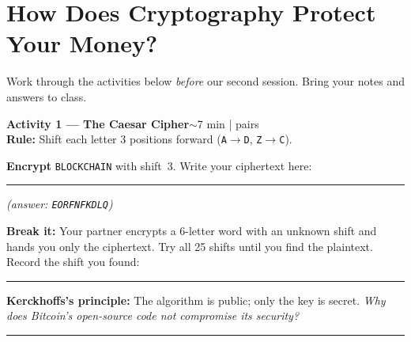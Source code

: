 \documentclass[11pt,a4paper]{article}
\newcommand{\activitybox}[3]{%
  \noindent\colorbox{mllavender4}{\parbox{\dimexpr\linewidth-2\fboxsep}{%
    \textbf{\color{mlpurple}#1}\hfill\textcolor{mlgray}{\small #2}\\[2pt]#3%
  }}\par\vspace{4pt}%
}
\begin{document}

\section*{\color{mlpurple}How Does Cryptography Protect Your Money?}

\vspace{-2pt}
\noindent\textcolor{mlgray}{\small Work through the activities below \emph{before} our second session.
Bring your notes and answers to class.}
\vspace{4pt}

\activitybox{Activity 1 --- The Caesar Cipher}{$\sim$7 min | pairs}{%
\textbf{Rule:} Shift each letter 3 positions forward (\texttt{A$\to$D}, \texttt{Z$\to$C}).

\vspace{2pt}
\textbf{Encrypt} \texttt{BLOCKCHAIN} with shift~3. Write your ciphertext here:
\quad\rule{5cm}{0.3pt}
\quad\textit{(answer: \texttt{EORFNFKDLQ})}

\vspace{3pt}
\textbf{Break it:} Your partner encrypts a 6-letter word with an unknown shift and hands you only
the ciphertext. Try all 25 shifts until you find the plaintext. Record the shift you found:
\quad\rule{2cm}{0.3pt}

\vspace{3pt}
\textbf{Kerckhoffs's principle:} The algorithm is public; only the key is secret.
\textit{Why does Bitcoin's open-source code not compromise its security?}
\vspace{4pt}
\noindent\rule{\linewidth}{0.3pt}
}

\vspace{2pt}
\end{document}
